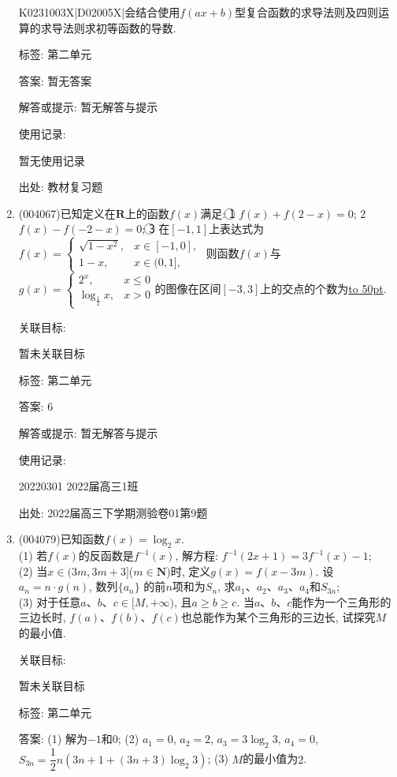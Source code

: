\documentclass[10pt,a4paper]{article}
\newcommand{\blank}[1]{\underline{\hbox to #1pt{}}}
\begin{document}
\begin{enumerate}[1.]
K0231003X|D02005X|会结合使用$f(ax+b)$型复合函数的求导法则及四则运算的求导法则求初等函数的导数.



标签: 第二单元

答案: 暂无答案

解答或提示: 暂无解答与提示

使用记录:

暂无使用记录


出处: 教材复习题
\item { (004067)}已知定义在$\mathbf{R}$上的函数$f(x)$满足: \textcircled{1} $f(x)+f(2-x)=0$; \textcircled{2} $f(x)-f(-2-x)=0$; \textcircled{3} 在$[-1,1]$上表达式为$f(x)=\begin{cases} \sqrt{1-x^2}, & x\in [-1,0], \\ 1-x, & x\in (0,1], \end{cases}$ 则函数$f(x)$与$g(x)=\begin{cases} {2^x}, & x\le 0 \\ \log_\frac 12x, & x>0 \end{cases}$的图像在区间$[-3,3]$上的交点的个数为\blank{50}.


关联目标:

暂未关联目标



标签: 第二单元

答案: $6$

解答或提示: 暂无解答与提示

使用记录:

20220301	2022届高三1班	


出处: 2022届高三下学期测验卷01第9题
\item { (004079)}已知函数$f(x)=\log_2x$.\\
(1) 若$f(x)$的反函数是$f^{-1}(x)$, 解方程: $f^{-1}(2x+1)=3f^{-1}(x)-1$;\\
(2) 当$x\in (3m, 3m+3]$($m\in \mathbf{N}$)时, 定义$g(x)=f(x-3m)$. 设$a_n=n\cdot g(n)$, 数列$\{a_n\}$ 的前$n$项和为$S_n$, 求$a_1$、$a_2$、$a_3$、$a_4$和$S_{3n}$;\\
(3) 对于任意$a$、$b$、$c\in [M,+\infty)$, 且$a\ge b\ge c$. 当$a$、$b$、$c$能作为一个三角形的三边长时, $f(a)$、$f(b)$、$f(c)$也总能作为某个三角形的三边长, 试探究$M$的最小值.


关联目标:

暂未关联目标



标签: 第二单元

答案: (1) 解为$-1$和$0$; (2) $a_1=0$, $a_2=2$, $a_3=3\log_2 3$, $a_4=0$, $S_{3n}=\dfrac 12 n(3n+1+(3n+3)\log_2 3)$; (3) $M$的最小值为$2$.


\end{enumerate}
\end{document}
